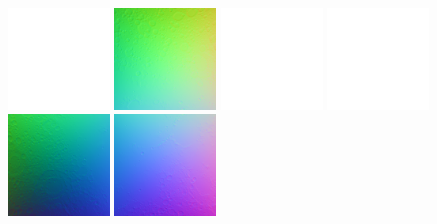 \documentclass[oneside,10pt]{memoir}
\begin{document}
\begin{Spacing}{1.1}
\begin{figure}
  \centering
  \includegraphics[width=0.24\textwidth]{fig/blank.pdf}
  \includegraphics[width=0.24\textwidth]{fig/dtmn2.png}
  \includegraphics[width=0.24\textwidth]{fig/blank.pdf}
  \includegraphics[width=0.24\textwidth]{fig/blank.pdf}\\\vspace{1pt}
  \includegraphics[width=0.24\textwidth]{fig/dtmn1.png}
  \includegraphics[width=0.24\textwidth]{fig/dtmn4.png}

\end{figure}
\end{Spacing}
\end{document}
